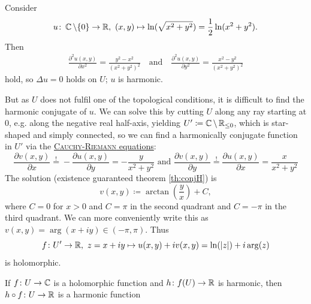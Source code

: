 \documentclass[a4paper,english]{article}
\begin{document}
\begin{example}
    Consider
    \begin{equation*}
        u \colon \CC \setminus \{0\} \to \R, \ 
        (x,y) \mapsto \ln(\sqrt{x^2 + y^2})
        = \frac{1}{2} \ln(x^2 + y^2).
    \end{equation*}
    Then
    \begin{gather*}
        \frac{\partial^2 u(x,y)}{\partial x^2}
        = \frac{y^2 - x^2}{(x^2 + y^2)^2}
        \quad \text{and} \quad
        \frac{\partial^2 u(x,y)}{\partial y^2}
        = \frac{x^2 - y^2}{(x^2 + y^2)^2}
    \end{gather*}
    hold, so $\Delta u = 0$ holds on $U$; $u$ is harmonic.
    
    But as $U$ does not fulfil one of the topological conditions, it is difficult to find the harmonic conjugate of $u$. 
    We can solve this by cutting $U$ along any ray starting at 0, e.g. along the negative real half-axis, yielding $U' \coloneqq \operatorname{\mathbb{C}} \setminus \operatorname{\mathbb{R}}_{\le 0}$, which is star-shaped and simply connected, so we can find a harmonically conjugate function in $U'$ via the \hyperref[eq:CR]{\textsc{Cauchy-Riemann} equations}:
    \begin{equation*}
        \frac{\partial v(x,y)}{\partial x}
        \overset{!}{=} - \frac{\partial u(x,y)}{\partial y}
        = - \frac{y}{x^2 + y^2}
        \text{ and } 
        \frac{\partial v(x, y)}{\partial y}
        \overset{!}{=} \frac{\partial u(x,y)}{\partial x}
        = \frac{x}{x^2 + y^2}
    \end{equation*}
    The solution (existence guaranteed theorem \ref{th:conjH}) is
    \begin{equation*}
        v(x,y)
        \coloneqq \arctan\left(\frac{y}{x}\right) + C,
    \end{equation*}
    where $C = 0$ for $x > 0$ and $C = \pi$ in the second quadrant and $C = - \pi$ in the third quadrant.
    We can more conveniently write this as $v(x, y) = \arg(x + i y) \in (- \pi, \pi)$.
    Thus
    \begin{equation*}
        f \colon U' \to \R, \ 
        z = x + i y
        \mapsto u(x, y) + i v(x,y)
        = \ln(| z |) + i \arg(z)
    \end{equation*}
    is holomorphic.
\end{example}

\begin{cor}[$\Delta u = 0$ if $f$ holomorphic and $\Delta (h \circ f) = 0$]
    If $f \colon U \to \operatorname{\mathbb{C}}$ is a holomorphic function and $h \colon f(U) \to \operatorname{\mathbb{R}}$ is harmonic, then $h \circ f \colon U \to \operatorname{\mathbb{R}}$ is a harmonic function 
\end{cor}
\end{document}

